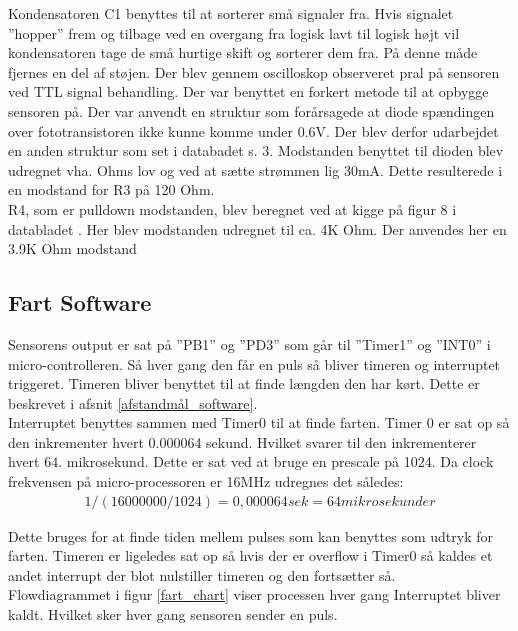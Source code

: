 Kondensatoren C1 benyttes til at sorterer små signaler fra. Hvis signalet ”hopper” frem og tilbage ved en overgang fra logisk lavt til logisk højt vil kondensatoren tage de små hurtige skift og sorterer dem fra. På denne måde fjernes en del af støjen.  
Der blev gennem oscilloskop observeret pral på sensoren ved TTL signal behandling. Der var benyttet en forkert metode til at opbygge sensoren på. Der var anvendt en struktur som forårsagede at diode spændingen over fototransistoren ikke kunne komme under 0.6V. Der blev derfor udarbejdet en anden struktur som set i databadet s. 3.  Modstanden benyttet til dioden blev udregnet vha. Ohms lov og ved at sætte strømmen lig 30mA. Dette resulterede i en modstand for R3 på 120 Ohm. \\

R4, som er pulldown modstanden, blev beregnet ved at kigge på figur 8 i databladet . Her blev modstanden udregnet til ca. 4K Ohm. Der anvendes her en 3.9K Ohm modstand \\

\subsection{Fart Software}
\label{fartmål_software}
Sensorens output er sat på ”PB1” og ”PD3” som går til ”Timer1” og ”INT0” i micro-controlleren. Så hver gang den får en puls så bliver timeren og interruptet triggeret. Timeren bliver benyttet til at finde længden den har kørt. Dette er beskrevet i afsnit \ref{afstandmål_software}. \\

Interruptet benyttes sammen med Timer0 til at finde farten. Timer 0 er sat op så den inkrementer hvert 0.000064 sekund. Hvilket svarer til den inkrementerer hvert 64. mikrosekund. Dette er sat ved at bruge en prescale på 1024. Da clock frekvensen på micro-processoren er 16MHz udregnes det således: \\
\begin{align*}
1/(16 000 000 / 1024) = 0,000064 sek = 64 mikrosekunder 
\end{align*}

Dette bruges for at finde tiden mellem pulses som kan benyttes som udtryk for farten. Timeren er ligeledes sat op så hvis der er overflow i Timer0 så kaldes et andet interrupt der blot nulstiller timeren og den fortsætter så. \\

Flowdiagrammet i figur \ref{fart_chart} viser processen hver gang Interruptet bliver kaldt. Hvilket sker hver gang sensoren sender en puls. \\

